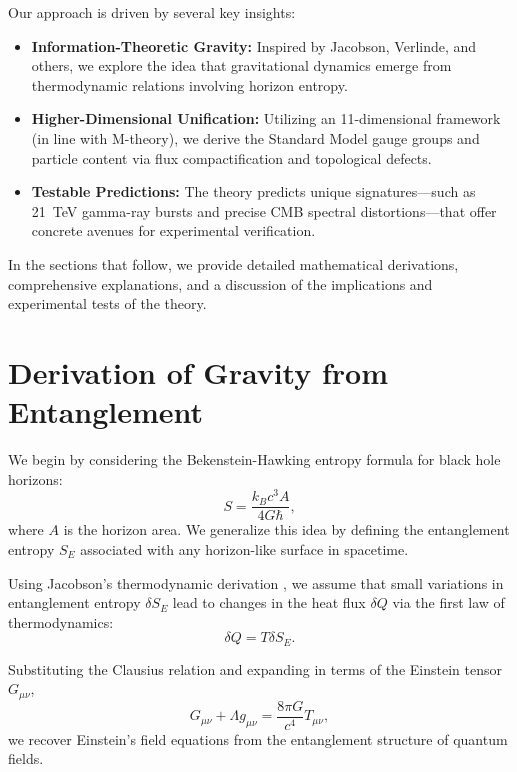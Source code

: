 \documentclass[12pt, a4paper]{article}
\begin{document}
Our approach is driven by several key insights:
\begin{itemize}
    \item \textbf{Information-Theoretic Gravity:} Inspired by Jacobson, Verlinde, and others, we explore the idea that gravitational dynamics emerge from thermodynamic relations involving horizon entropy.
    \item \textbf{Higher-Dimensional Unification:} Utilizing an 11-dimensional framework (in line with M-theory), we derive the Standard Model gauge groups and particle content via flux compactification and topological defects.
    \item \textbf{Testable Predictions:} The theory predicts unique signatures—such as 21~TeV gamma-ray bursts and precise CMB spectral distortions—that offer concrete avenues for experimental verification.
\end{itemize}

In the sections that follow, we provide detailed mathematical derivations, comprehensive explanations, and a discussion of the implications and experimental tests of the theory.

\section{Derivation of Gravity from Entanglement}
We begin by considering the Bekenstein-Hawking entropy formula for black hole horizons:
\begin{equation}
    S = \frac{k_B c^3 A}{4 G \hbar},
\end{equation}
where $A$ is the horizon area. We generalize this idea by defining the entanglement entropy $S_E$ associated with any horizon-like surface in spacetime.

Using Jacobson’s thermodynamic derivation \cite{jacobson1995}, we assume that small variations in entanglement entropy $\delta S_E$ lead to changes in the heat flux $\delta Q$ via the first law of thermodynamics:
\begin{equation}
    \delta Q = T \delta S_E.
\end{equation}

Substituting the Clausius relation and expanding in terms of the Einstein tensor $G_{\mu\nu}$,
\begin{equation}
    G_{\mu\nu} + \Lambda g_{\mu\nu} = \frac{8 \pi G}{c^4} T_{\mu\nu},
\end{equation}
we recover Einstein’s field equations from the entanglement structure of quantum fields.
\end{document}
